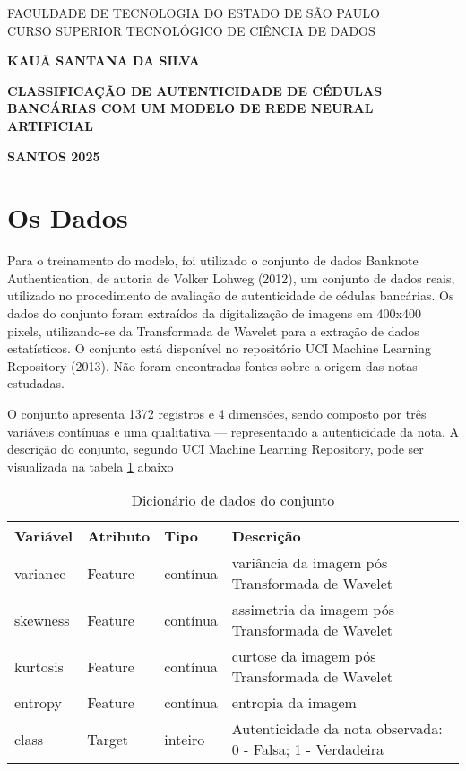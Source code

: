 \documentclass[12pt]{article}
\begin{document}
\begin{center}
    \large FACULDADE DE TECNOLOGIA DO ESTADO DE SÃO PAULO\\
    CURSO SUPERIOR TECNOLÓGICO DE CIÊNCIA DE DADOS

    \vspace{5cm}

    \textbf{KAUÃ SANTANA DA SILVA}

    \vspace{3cm}

    \textbf{CLASSIFICAÇÃO DE AUTENTICIDADE DE CÉDULAS BANCÁRIAS COM UM MODELO DE REDE NEURAL ARTIFICIAL}

    \vfill

    \textbf{SANTOS 2025}
\end{center}

\newpage
\tableofcontents
\newpage

\section{Os Dados}

Para o treinamento do modelo, foi utilizado o conjunto de dados Banknote Authentication, de autoria de Volker Lohweg (2012), um conjunto de dados reais, utilizado no procedimento de avaliação de autenticidade de cédulas bancárias. Os dados do conjunto foram extraídos da digitalização de imagens em 400x400 pixels, utilizando-se da Transformada de Wavelet para a extração de dados estatísticos. O conjunto está disponível no repositório UCI Machine Learning Repository (2013). Não foram encontradas fontes sobre a origem das notas estudadas.

O conjunto apresenta 1372 registros e 4 dimensões, sendo composto por três variáveis contínuas e uma qualitativa — representando a autenticidade da nota. A descrição do conjunto, segundo UCI Machine Learning Repository, pode ser visualizada na tabela \ref{tab:dic} abaixo

\begin{table}[H]
\centering
\caption{Dicionário de dados do conjunto}
\label{tab:dic}
\begin{tabular}{|l|l|l|p{7cm}|}
\hline
\textbf{Variável} & \textbf{Atributo} & \textbf{Tipo} & \textbf{Descrição} \\ \hline
variance & Feature & contínua & variância da imagem pós Transformada de Wavelet \\ \hline
skewness & Feature & contínua & assimetria da imagem pós Transformada de Wavelet \\ \hline
kurtosis & Feature & contínua & curtose da imagem pós Transformada de Wavelet \\ \hline
entropy & Feature & contínua & entropia da imagem \\ \hline
class & Target & inteiro & Autenticidade da nota observada: 0 - Falsa; 1 - Verdadeira \\ \hline
\end{tabular}
\end{table}
\end{document}
